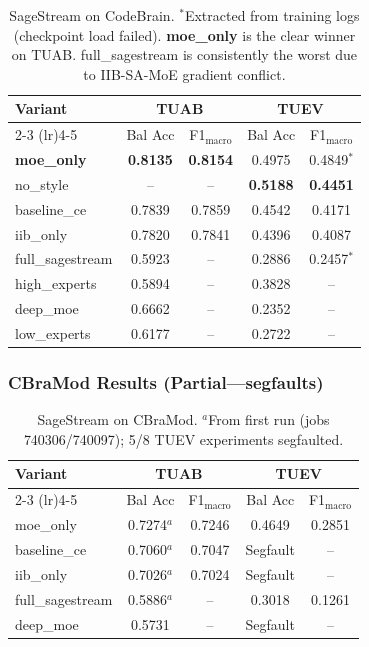 \documentclass{article}
\begin{document}
\begin{table}[h]
\centering
\small
\begin{tabular}{@{}lcccc@{}}
\toprule
Variant & \multicolumn{2}{c}{TUAB} & \multicolumn{2}{c}{TUEV} \\
\cmidrule(lr){2-3} \cmidrule(lr){4-5}
& Bal Acc & F1$_\text{macro}$ & Bal Acc & F1$_\text{macro}$ \\
\midrule
\textbf{moe\_only} & \textbf{0.8135} & \textbf{0.8154} & 0.4975 & 0.4849$^*$ \\
no\_style & -- & -- & \textbf{0.5188} & \textbf{0.4451} \\
baseline\_ce & 0.7839 & 0.7859 & 0.4542 & 0.4171 \\
iib\_only & 0.7820 & 0.7841 & 0.4396 & 0.4087 \\
full\_sagestream & 0.5923 & -- & 0.2886 & 0.2457$^*$ \\
high\_experts & 0.5894 & -- & 0.3828 & -- \\
deep\_moe & 0.6662 & -- & 0.2352 & -- \\
low\_experts & 0.6177 & -- & 0.2722 & -- \\
\bottomrule
\end{tabular}
\caption{SageStream on CodeBrain. $^*$Extracted from training logs (checkpoint load failed). \textbf{moe\_only} is the clear winner on TUAB. full\_sagestream is consistently the worst due to IIB-SA-MoE gradient conflict.}
\end{table}

\subsubsection{CBraMod Results (Partial---segfaults)}

\begin{table}[h]
\centering
\small
\begin{tabular}{@{}lcccc@{}}
\toprule
Variant & \multicolumn{2}{c}{TUAB} & \multicolumn{2}{c}{TUEV} \\
\cmidrule(lr){2-3} \cmidrule(lr){4-5}
& Bal Acc & F1$_\text{macro}$ & Bal Acc & F1$_\text{macro}$ \\
\midrule
moe\_only & 0.7274$^a$ & 0.7246 & 0.4649 & 0.2851 \\
baseline\_ce & 0.7060$^a$ & 0.7047 & Segfault & -- \\
iib\_only & 0.7026$^a$ & 0.7024 & Segfault & -- \\
full\_sagestream & 0.5886$^a$ & -- & 0.3018 & 0.1261 \\
deep\_moe & 0.5731 & -- & Segfault & -- \\
\bottomrule
\end{tabular}
\caption{SageStream on CBraMod. $^a$From first run (jobs 740306/740097); 5/8 TUEV experiments segfaulted.}
\end{table}
\end{document}
